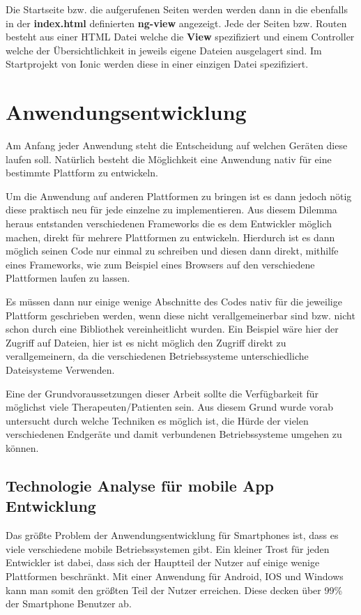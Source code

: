 Die Startseite bzw. die aufgerufenen Seiten werden werden dann in die ebenfalls in der \textbf{index.html} definierten \textbf{ng-view} angezeigt. Jede der Seiten bzw. Routen besteht aus einer HTML Datei welche die \textbf{View} spezifiziert und einem Controller welche der Übersichtlichkeit in jeweils eigene Dateien ausgelagert sind. Im Startprojekt von Ionic werden diese in einer einzigen Datei spezifiziert.

\section{Anwendungsentwicklung}\label{Anwendungsentwicklung}
Am Anfang jeder Anwendung steht die Entscheidung auf welchen Geräten diese laufen soll. Natürlich besteht die Möglichkeit eine Anwendung nativ für eine bestimmte Plattform zu entwickeln.

Um die Anwendung auf anderen Plattformen zu bringen ist es dann jedoch nötig diese praktisch neu für jede einzelne zu implementieren. Aus diesem Dilemma heraus entstanden verschiedenen Frameworks die es dem Entwickler möglich machen, direkt für mehrere Plattformen zu entwickeln. Hierdurch ist es dann möglich seinen Code nur einmal zu schreiben und diesen dann direkt, mithilfe eines Frameworks, wie zum Beispiel eines Browsers auf den verschiedene Plattformen laufen zu lassen.

Es müssen dann nur einige wenige Abschnitte des Codes nativ für die jeweilige Plattform geschrieben werden, wenn diese nicht verallgemeinerbar sind bzw. nicht schon durch eine Bibliothek vereinheitlicht wurden. Ein Beispiel wäre hier der Zugriff auf Dateien, hier ist es nicht möglich den Zugriff direkt zu verallgemeinern, da die verschiedenen Betriebssysteme unterschiedliche Dateisysteme Verwenden.

Eine der Grundvoraussetzungen dieser Arbeit sollte die Verfügbarkeit für möglichst viele Therapeuten/Patienten sein. Aus diesem Grund wurde vorab untersucht durch welche Techniken es möglich ist, die Hürde der vielen verschiedenen Endgeräte und damit verbundenen Betriebssysteme umgehen zu können. 


\subsection{Technologie Analyse für mobile App Entwicklung}\label{MobileAnwedungsentwicklung}
Das größte Problem der Anwendungsentwicklung für Smartphones ist, dass es viele verschiedene mobile Betriebssystemen gibt. Ein kleiner Trost für jeden Entwickler ist dabei, dass sich der Hauptteil der Nutzer auf einige wenige Plattformen beschränkt. Mit einer Anwendung für Android, IOS und Windows kann man somit den größten Teil der Nutzer erreichen. Diese decken über 99\% \cite{STA16} der Smartphone Benutzer ab.

